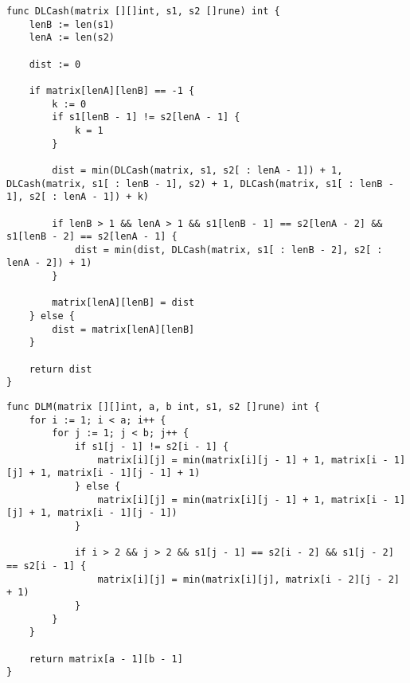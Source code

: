 \begin{lstlisting}[label=lst:DLCash,caption=Функция нахождения расстояния Левенштейна-Дамерау с помощью рекурсии и кеша]
func DLCash(matrix [][]int, s1, s2 []rune) int {
    lenB := len(s1)
    lenA := len(s2)

    dist := 0

    if matrix[lenA][lenB] == -1 {
        k := 0
        if s1[lenB - 1] != s2[lenA - 1] {
            k = 1
        }

        dist = min(DLCash(matrix, s1, s2[ : lenA - 1]) + 1, DLCash(matrix, s1[ : lenB - 1], s2) + 1, DLCash(matrix, s1[ : lenB - 1], s2[ : lenA - 1]) + k)

        if lenB > 1 && lenA > 1 && s1[lenB - 1] == s2[lenA - 2] && s1[lenB - 2] == s2[lenA - 1] {
            dist = min(dist, DLCash(matrix, s1[ : lenB - 2], s2[ : lenA - 2]) + 1)
        }

        matrix[lenA][lenB] = dist
    } else {
        dist = matrix[lenA][lenB]
    }

    return dist
}
\end{lstlisting}

\begin{lstlisting}[label=lst:DLM,caption=Функция нахождения расстояния Дамерау-Левенштейна нерекурсивным способом]
func DLM(matrix [][]int, a, b int, s1, s2 []rune) int {
    for i := 1; i < a; i++ {
        for j := 1; j < b; j++ {
            if s1[j - 1] != s2[i - 1] {
                matrix[i][j] = min(matrix[i][j - 1] + 1, matrix[i - 1][j] + 1, matrix[i - 1][j - 1] + 1)
            } else {
                matrix[i][j] = min(matrix[i][j - 1] + 1, matrix[i - 1][j] + 1, matrix[i - 1][j - 1])
            }

            if i > 2 && j > 2 && s1[j - 1] == s2[i - 2] && s1[j - 2] == s2[i - 1] {
                matrix[i][j] = min(matrix[i][j], matrix[i - 2][j - 2] + 1)
            }
        }
    }

    return matrix[a - 1][b - 1]
}
\end{lstlisting}

\clearpage

